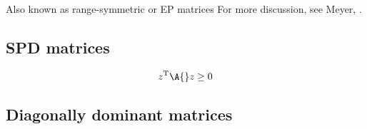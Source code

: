 Also known as range-symmetric or EP matrices
For more discussion, see Meyer, \cite[p. 408]{Meyer}.

\subsection{SPD matrices}
\begin{equation}
  z^{\mathrm{T}}\A{}z \ge 0
\end{equation}

\subsection{Diagonally dominant matrices}


\endinput